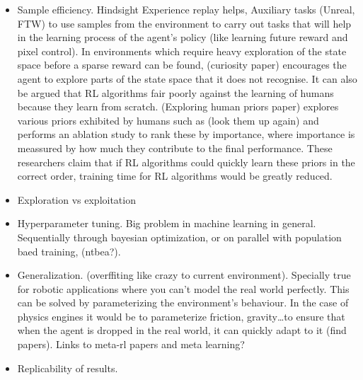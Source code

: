 \documentclass{../main.tex}{}
\begin{document}
\begin{itemize}
    \item Sample efficiency. Hindsight Experience replay helps, Auxiliary tasks (Unreal, FTW) to use samples from the environment to carry out tasks that will help in the learning process of the agent's policy (like learning future reward and pixel control). In environments which require heavy exploration of the state space before a sparse reward can be found, (curiosity paper) encourages the agent to explore parts of the state space that it does not recognise. It can also be argued that RL algorithms fair poorly against the learning of humans because they learn from scratch. (Exploring human priors paper) explores various priors exhibited by humans such as (look them up again) and performs an ablation study to rank these by importance, where importance is meassured by how much they contribute to the final performance. These researchers claim that if  RL algorithms could quickly learn these priors in the correct order, training time for RL algorithms would be greatly reduced.
    \item Exploration vs exploitation
    \item Hyperparameter tuning. Big problem in machine learning in general. Sequentially through bayesian optimization, or on parallel with population baed training, (ntbea?). 
    \item Generalization. (overffiting like crazy to current environment). Specially true for robotic applications where you can't model the real world perfectly. This can be solved by parameterizing the environment's behaviour. In the case of physics engines it would be to parameterize friction, gravity\ldots to ensure that when the agent is dropped in the real world, it can quickly adapt to it (find papers). Links to meta-rl papers and meta learning?
    \item Replicability of results.
\end{itemize}
\end{document}
